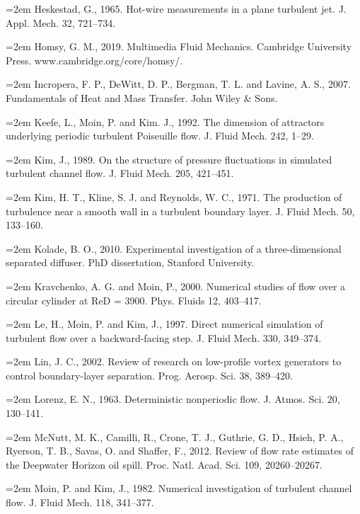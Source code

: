 \documentclass[12pt,a4paper,openany,fontset=none]{ctexbook}
\begin{document}
\par\hangindent=2em Heskestad, G., 1965. Hot-wire measurements in a plane turbulent jet. J. Appl. Mech. 32, 721–734.
\par\hangindent=2em Homsy, G. M., 2019. Multimedia Fluid Mechanics. Cambridge University Press. www.cambridge.org/core/homsy/.
\par\hangindent=2em Incropera, F. P., DeWitt, D. P., Bergman, T. L. and Lavine, A. S., 2007. Fundamentals of Heat and Mass Transfer. John Wiley \& Sons.
\par\hangindent=2em Keefe, L., Moin, P. and Kim. J., 1992. The dimension of attractors underlying periodic turbulent Poiseuille flow. J. Fluid Mech. 242, 1–29.
\par\hangindent=2em Kim, J., 1989. On the structure of pressure fluctuations in simulated turbulent channel flow. J. Fluid Mech. 205, 421–451.
\par\hangindent=2em Kim, H. T., Kline, S. J. and Reynolds, W. C., 1971. The production of turbulence near a smooth wall in a turbulent boundary layer. J. Fluid Mech. 50, 133–160.
\par\hangindent=2em Kolade, B. O., 2010. Experimental investigation of a three-dimensional separated diffuser. PhD dissertation, Stanford University.
\par\hangindent=2em Kravchenko, A. G. and Moin, P., 2000. Numerical studies of flow over a circular cylinder at ReD = 3900. Phys. Fluids 12, 403–417.
\par\hangindent=2em Le, H., Moin, P. and Kim, J., 1997. Direct numerical simulation of turbulent flow over a backward-facing step. J. Fluid Mech. 330, 349–374.
\par\hangindent=2em Lin, J. C., 2002. Review of research on low-profile vortex generators to control boundary-layer separation. Prog. Aerosp. Sci. 38, 389–420.
\par\hangindent=2em Lorenz, E. N., 1963. Deterministic nonperiodic flow. J. Atmos. Sci. 20, 130–141.
\par\hangindent=2em McNutt, M. K., Camilli, R., Crone, T. J., Guthrie, G. D., Hsieh, P. A., Ryerson, T. B., Savas, O. and Shaffer, F., 2012. Review of flow rate estimates of the Deepwater Horizon oil spill. Proc. Natl. Acad. Sci. 109, 20260–20267.
\par\hangindent=2em Moin, P. and Kim, J., 1982. Numerical investigation of turbulent channel flow. J. Fluid Mech. 118, 341–377.
\end{document}
